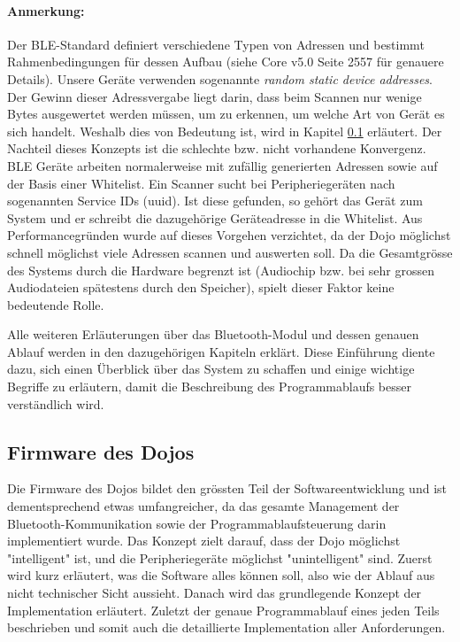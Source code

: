 \paragraph{Anmerkung: }Der BLE-Standard definiert verschiedene Typen von Adressen und bestimmt Rahmenbedingungen für dessen Aufbau (siehe Core v5.0 Seite 2557 \cite{BLE_SPEC} für genauere Details). Unsere Geräte verwenden sogenannte \textit{random static device addresses}.
Der Gewinn dieser Adressvergabe liegt darin, dass beim Scannen nur wenige Bytes ausgewertet werden müssen, um zu erkennen, um welche Art von Gerät es sich handelt. Weshalb dies von Bedeutung ist, wird in Kapitel \ref{} erläutert.
Der Nachteil dieses Konzepts ist die schlechte bzw. nicht vorhandene Konvergenz. BLE Geräte arbeiten normalerweise mit zufällig generierten Adressen sowie auf der Basis einer Whitelist. Ein Scanner sucht bei Peripheriegeräten nach sogenannten Service IDs (uuid). Ist diese gefunden, so gehört das Gerät zum System und er schreibt die dazugehörige Geräteadresse in die Whitelist. Aus Performancegründen wurde auf dieses Vorgehen verzichtet, da der Dojo möglichst schnell möglichst viele Adressen scannen und auswerten soll. Da die Gesamtgrösse des Systems durch die Hardware begrenzt ist (Audiochip bzw. bei sehr grossen Audiodateien spätestens durch den Speicher), spielt dieser Faktor keine bedeutende Rolle. 
\vspace{1cm}


Alle weiteren Erläuterungen über das Bluetooth-Modul und dessen genauen Ablauf werden in den dazugehörigen Kapiteln erklärt. Diese Einführung diente dazu, sich einen Überblick über das System zu schaffen und einige wichtige Begriffe zu erläutern, damit die Beschreibung des Programmablaufs besser verständlich wird. 

\subsection{Firmware des Dojos}
Die Firmware des Dojos bildet den grössten Teil der Softwareentwicklung und ist dementsprechend etwas umfangreicher, da das gesamte Management der Bluetooth-Kommunikation sowie der Programmablaufsteuerung darin implementiert wurde. Das Konzept zielt darauf, dass der Dojo möglichst "intelligent" ist, und die Peripheriegeräte möglichst "unintelligent" sind. 
Zuerst wird kurz erläutert, was die Software alles können soll, also wie der Ablauf aus nicht technischer Sicht aussieht. Danach wird das grundlegende Konzept der Implementation erläutert. Zuletzt der genaue Programmablauf eines jeden Teils beschrieben und somit auch die detaillierte Implementation aller Anforderungen.
